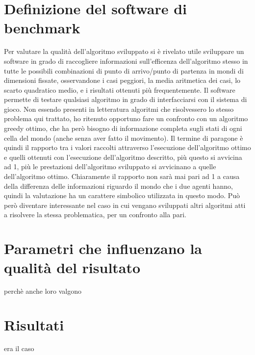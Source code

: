 \section{Definizione del software di benchmark}
Per valutare la qualità dell'algoritmo sviluppato si è rivelato utile sviluppare un software in grado di raccogliere informazioni sull'efficenza dell'algoritmo stesso in tutte le possibili combinazioni di punto di arrivo/punto di partenza in mondi di dimensioni fissate, osservandone i casi peggiori, la media aritmetica dei casi, lo scarto quadratico medio, e i risultati ottenuti più frequentemente. Il software permette di testare qualsiasi algoritmo in grado di interfacciarsi con il sistema di gioco. Non essendo presenti in letteratura algoritmi che risolvessero lo stesso problema qui trattato, ho ritenuto opportuno fare un confronto con un algoritmo greedy ottimo, che ha però bisogno di informazione completa sugli stati di ogni cella del mondo (anche senza aver fatto il movimento). Il termine di paragone è quindi il rapporto tra i valori raccolti attraverso l'esecuzione dell'algoritmo ottimo e quelli ottenuti con l'esecuzione dell'algoritmo descritto, più questo si avvicina ad 1, più le prestazioni dell'algoritmo sviluppato si avvicinano a quelle dell'algoritmo ottimo. Chiaramente il rapporto non sarà mai pari ad 1 a causa della differenza delle informazioni riguardo il mondo che i due agenti hanno, quindi la valutazione ha un carattere simbolico utilizzata in questo modo. Può però diventare interessante nel caso in cui vengano sviluppati altri algoritmi atti a risolvere la stessa problematica, per un confronto alla pari.
	
\section{Parametri che influenzano la qualità del risultato}
	perchè anche loro valgono
	
\section{Risultati}
	era il caso
